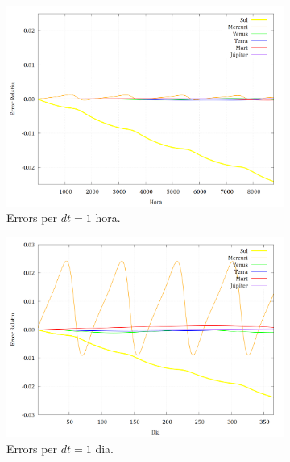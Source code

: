 \documentclass[10pt, twoside, a4paper]{article}
\begin{document}
\begin{figure}[h!]
    \centering
    
    \begin{subfigure}[b]{0.32\linewidth}
        \centering
        \includegraphics[width=\linewidth]{../Error/error_1_hora.png}
        \caption{Errors per $dt=1$ hora.}
    \end{subfigure}
    \hfill
    \begin{subfigure}[b]{0.32\linewidth}
        \centering
        \includegraphics[width=\linewidth]{../Error/error_1_dia.png}
        \caption{Errors per $dt=1$ dia.}
    \end{subfigure}
    \hfill
    \begin{subfigure}[b]{0.32\linewidth}
        \centering

\end{subfigure}
\end{figure}
\end{document}
